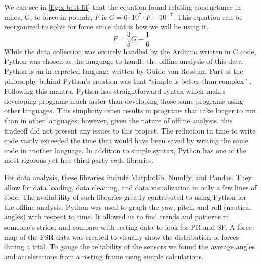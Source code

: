 We can see in \ref{fig:x best fit} that the equation found relating conductance in mhos, G, to force in pounds, $F$ is $G = 6\cdot10^7\cdot F - 10^{-7}$.
This equation can be reorganized to solve for force since that is how we will be using it.
$$F=\frac{3}{5}G+\frac{1}{6}$$
While the data collection was entirely handled by the Arduino written in C code, Python was chosen as the language to handle the offline analysis of this data.
Python is an interpreted language written by Guido van Rossum.
Part of the philosophy behind Python’s creation was that ``simple is better than complex'' \parencite{peters}.
Following this mantra, Python has straightforward syntax which makes developing programs much faster than developing those same programs using other languages.
This simplicity often results in programs that take longer to run than in other languages; however, given the nature of offline analysis, this tradeoff did not present any issues to this project.
The reduction in time to write code vastly exceeded the time that would have been saved by writing the same code in another language.
In addition to simple syntax, Python has one of the most rigorous yet free third-party code libraries.\par
For data analysis, these libraries include Matplotlib, NumPy, and Pandas.
They allow for data loading, data cleaning, and data visualization in only a few lines of code.
The availability of such libraries greatly contributed to using Python for the offline analysis.
Python was used to graph the yaw, pitch, and roll (nautical angles) with respect to time.
It allowed us to find trends and patterns in someone’s stride, and compare with resting data to look for PR and SP.
A force-map of the FSR data was created to visually show the distribution of forces during a trial.
To gauge the reliability of the sensors we found the average angles and accelerations from a resting frame using simple calculations.\par
